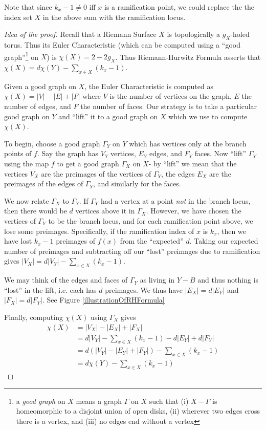 \documentclass[12pt]{book}%
\theoremstyle{plain}
\theoremstyle{definition}
\theoremstyle{remark}
\begin{document}
Note that since $k_x-1 \neq 0$ iff $x$ is a ramification point, we could replace the the index set $X$ in the above sum with the ramification locus.

\begin{proof}[Idea of the proof]
Recall that a Riemann Surface $X$ is topologically a $g_X$-holed torus. Thus its Euler Characteristic (which can be computed using a ``good graph''\footnote{a \textit{good graph} on $X$ means a graph $\Gamma$ on $X$ such that (i) $X-\Gamma$ is homeomorphic to a disjoint union of open disks, (ii) wherever two edges cross there is a vertex, and (iii) no edges end without a vertex} on $X$) is $\chi(X) = 2-2g_X$. Thus Riemann-Hurwitz Formula asserts that $\chi(X) = d\chi(Y) - \sum_{x \in X} (k_x - 1)$.

Given a good graph on $X$, the Euler Characteristic is computed as $\chi(X) = |V|-|E|+|F|$ where $V$ is the number of vertices on the graph, $E$ the number of edges, and $F$ the number of faces. Our strategy is to take a particular good graph on $Y$ and ``lift'' it to a good graph on $X$ which we use to compute $\chi(X)$.

To begin, choose a good graph $\Gamma_Y$ on $Y$ which has vertices only at the branch points of $f$. Say the graph has $V_Y$ vertices, $E_Y$ edges, and $F_Y$ faces. Now ``lift'' $\Gamma_Y$ using the map $f$ to get a good graph $\Gamma_X$ on $X$- by ``lift'' we mean that the vertices $V_X$ are the preimages of the vertices of $\Gamma_Y$, the edges $E_X$ are the preimages of the edges of $\Gamma_Y$, and similarly for the faces.

We now relate $\Gamma_X$ to $\Gamma_Y$. If $\Gamma_Y$ had a vertex at a point \textit{not} in the branch locus, then there would be $d$ vertices above it in $\Gamma_X$. However, we have chosen the vertices of $\Gamma_Y$ to be the branch locus, and for each ramification point above, we lose some preimages. Specifically, if the ramification index of $x$ is $k_x$, then we have lost $k_x-1$ preimages of $f(x)$ from the ``expected'' $d$. Taking our expected number of preimages and subtracting off our ``lost'' preimages due to ramification gives $|V_X| = d|V_Y| - \sum_{x \in X} (k_x - 1)$.

We may think of the edges and faces of $\Gamma_Y$ as living in $Y-B$ and thus nothing is ``lost'' in the lift, i.e. each has $d$ preimages. We thus have $|E_X| = d|E_Y|$ and $|F_X| = d|F_Y|$. See Figure \ref{illustrationOfRHFormula}

Finally, computing $\chi(X)$ using $\Gamma_X$ gives
\begin{align*}
\chi(X) &= |V_X|-|E_X|+|F_X| \\
&= d|V_Y| - \sum_{x \in X} (k_x - 1) - d|E_Y| + d|F_Y| \\
&= d(|V_Y|-|E_Y|+|F_Y|) - \sum_{x \in X} (k_x - 1) \\
&= d\chi(Y) - \sum_{x \in X} (k_x - 1)
\end{align*}
\end{proof}
\end{document}
